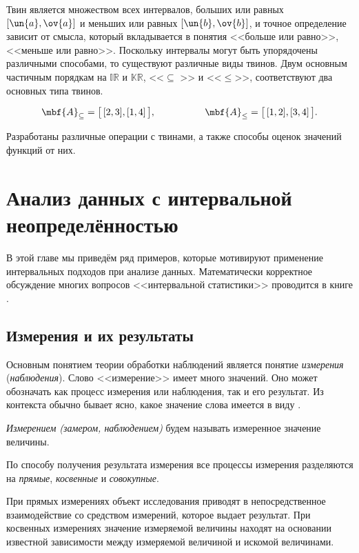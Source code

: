 \documentclass[a5paper,openany]{book}
\begin{document}
Твин является множеством всех интервалов, больших или равных $[\un{a}, \ov{a}]$ и меньших
или равных $[\un{b}, \ov{b}]$, и точное определение зависит от смысла, который вкладывается в понятия <<больше или равно>>, <<меньше или равно>>.
Поскольку интервалы могут быть упорядочены различными способами, то существуют 
различные виды твинов. Двум основным частичным порядкам на $\mathbb{IR}$ и $\mathbb{KR}$, 
<<$\subseteq$ >> и <<$\leq$>>,  соответствуют два основных типа твинов. 

\begin{equation}\label{TwinPresentations}
\mbf{A}_{\subseteq} = \bigl[\,[2,3], [1,4 ]\,\bigr], 
\hspace{18mm} 
\mbf{A}_{\leq} = \bigl[\,[1,2], [3,4 ]\,\bigr].
\end{equation}

Разработаны 
различные операции с твинами, а также способы оценок значений функций от них. 


\section{Анализ данных с интервальной неопределённостью} \label{InteDataAnalysis}

В этой главе мы приведём ряд примеров, которые мотивируют применение интервальных подходов при анализе данных. Математически корректное обсуждение многих вопросов <<интервальной статистики>> проводится в книге \cite{BookIntStat}. 

\subsection{Измерения и их результаты} 
\label{MeasuResultSect} 

Основным понятием теории обработки наблюдений является понятие \emph{измерения} (\emph{наблюдения}). Слово <<измерение>> имеет много значений. Оно может 
обозначать как процесс измерения или наблюдения, так и его результат. Из контекста обычно 
бывает ясно, какое значение слова имеется в виду \cite{BookIntStat}.  
\begin{definition}       
\textsl{Измерением (замером, наблюдением)} будем называть измеренное значение величины. 
\end{definition}
По способу получения результата измерения все процессы измерения разделяются 
на \emph{прямые}, \emph{косвенные} и \emph{совокупные}. 

При прямых измерениях объект исследования приводят в непосредственное взаимодействие 
со средством измерений, которое выдает результат.   
При косвенных измерениях значение измеряемой величины находят на основании  
известной зависимости между измеряемой величиной и искомой величинами. 
\end{document}
